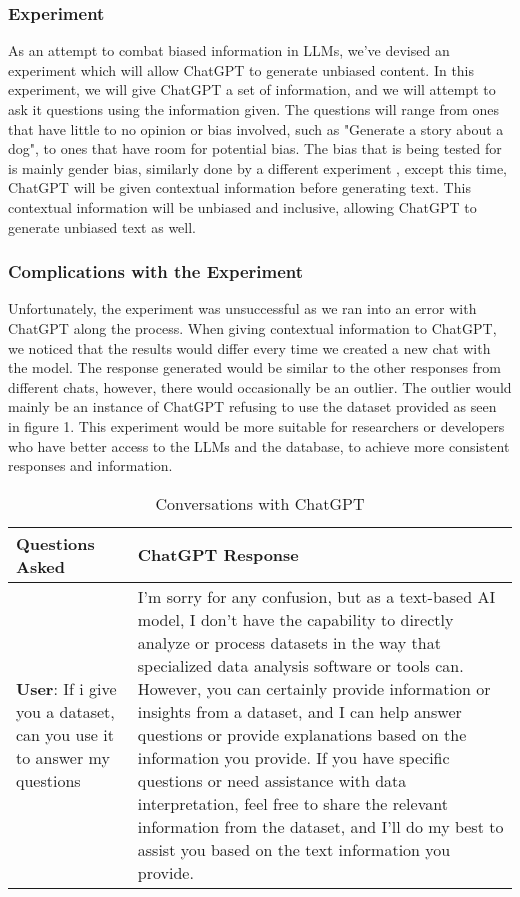 \documentclass[12pt]{extarticle}
\begin{document}
\subsubsection{Experiment}
As an attempt to combat biased information in LLMs, we've devised an experiment which will allow ChatGPT to generate unbiased content. In this experiment, we will give ChatGPT a set of information, and we will attempt to ask it questions using the information given. The questions will range from ones that have little to no opinion or bias involved, such as "Generate a story about a dog", to ones that have room for potential bias. The bias that is being tested for is mainly gender bias, similarly done by a different experiment \cite{genderbias}, except this time, ChatGPT will be given contextual information before generating text. This contextual information will be unbiased and inclusive, allowing ChatGPT to generate unbiased text as well.

\subsubsection{Complications with the Experiment}
Unfortunately, the experiment was unsuccessful as we ran into an error with ChatGPT along the process. When giving contextual information to ChatGPT, we noticed that the results would differ every time we created a new chat with the model. The response generated would be similar to the other responses from different chats, however, there would occasionally be an outlier. The outlier would mainly be an instance of ChatGPT refusing to use the dataset provided as seen in figure 1. This experiment would be more suitable for researchers or developers who have better access to the LLMs and the database, to achieve more consistent responses and information.

\begin{longtable}{|p{7.5cm}|p{6cm}|}
     \caption{Conversations with ChatGPT}
    \label{tab:ConvoWithGPT}
         \\ \hline
         \textbf{Questions Asked} & \textbf{ChatGPT Response}\\
         \hline
         \textbf{User}: If i give you a dataset, can you use it to answer my questions & 
         
         I'm sorry for any confusion, but as a text-based AI model, I don't have the capability to directly analyze or process datasets in the way that specialized data analysis software or tools can. However, you can certainly provide information or insights from a dataset, and I can help answer questions or provide explanations based on the information you provide. If you have specific questions or need assistance with data interpretation, feel free to share the relevant information from the dataset, and I'll do my best to assist you based on the text information you provide.\\
         \hline
\end{longtable}
\end{document}
